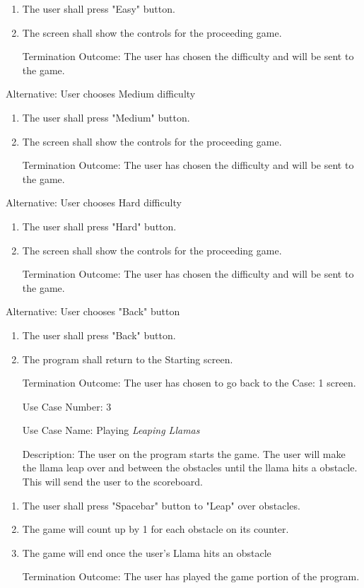 \documentclass[10pt,conference,onecolumn,compsoc]{IEEEtran}
\begin{document}
\begin{enumerate}
\item The user shall press "Easy" button.
\item The screen shall show the controls for the proceeding game.
\item[Termination Outcome:] The user has chosen the difficulty and will be sent to the game.
\end{enumerate}

Alternative: User chooses Medium difficulty
\begin{enumerate}
\item The user shall press "Medium" button.
\item The screen shall show the controls for the proceeding game.
\item[Termination Outcome:] The user has chosen the difficulty and will be sent to the game.
\end{enumerate}

Alternative: User chooses Hard difficulty
\begin{enumerate}
\item The user shall press "Hard" button.
\item The screen shall show the controls for the proceeding game.
\item[Termination Outcome:] The user has chosen the difficulty and will be sent to the game.
\end{enumerate}

Alternative: User chooses "Back" button
\begin{enumerate}
\item The user shall press "Back" button.
\item The program shall return to the Starting screen.
\item[Termination Outcome:] The user has chosen to go back to the Case: 1 screen.
\end{enumerate}

\begin{itemize}
\item[Use Case Number:] 3
\item[Use Case Name:] Playing \textit{Leaping Llamas}
\item[Description:] The user on the program starts the game. The user will make the llama leap over and between the obstacles until the llama hits a obstacle. This will send the user to the scoreboard.
\end{itemize}

\begin{enumerate}
\item The user shall press "Spacebar" button to "Leap" over obstacles.
\item The game will count up by 1 for each obstacle on its counter.
\item The game will end once the user's Llama hits an obstacle
\item[Termination Outcome:] The user has played the game portion of the program.
\end{enumerate}
\end{document}
